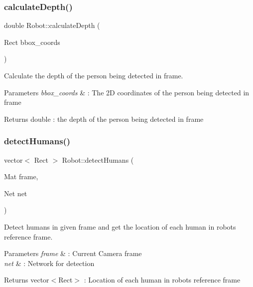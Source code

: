 \subsubsection{\texorpdfstring{calculate\+Depth()}{calculateDepth()}}
{\footnotesize\ttfamily double Robot\+::calculate\+Depth (\begin{DoxyParamCaption}\item[{Rect}]{bbox\+\_\+coords }\end{DoxyParamCaption})}



Calculate the depth of the person being detected in frame. 


\begin{DoxyParams}{Parameters}
{\em bbox\+\_\+coords} & \+: The 2D coordinates of the person being detected in frame \\
\hline
\end{DoxyParams}
\begin{DoxyReturn}{Returns}
double \+: the depth of the person being detected in frame 
\end{DoxyReturn}
\mbox{\label{classRobot_ab98ffeccb3b37392f4336e3a6dd14913}} 
\subsubsection{\texorpdfstring{detect\+Humans()}{detectHumans()}}
{\footnotesize\ttfamily vector$<$ Rect $>$ Robot\+::detect\+Humans (\begin{DoxyParamCaption}\item[{Mat}]{frame,  }\item[{Net}]{net }\end{DoxyParamCaption})}



Detect humans in given frame and get the location of each human in robot\textquotesingle{}s reference frame. 


\begin{DoxyParams}{Parameters}
{\em frame} & \+: Current Camera frame \\
\hline
{\em net} & \+: Network for detection \\
\hline
\end{DoxyParams}
\begin{DoxyReturn}{Returns}
vector$<$\+Rect$>$ \+: Location of each human in robot\textquotesingle{}s reference frame 
\end{DoxyReturn}
\mbox{\label{classRobot_ad5b286958dbf40329f8cebdb9c9c4987}} 
